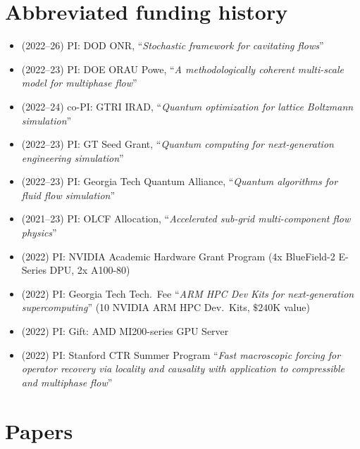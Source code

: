 \documentclass[11pt]{article}
\begin{document}
\section*{Abbreviated funding history}

\begin{itemize}
    \item (2022--26) PI: DOD ONR, ``\textit{Stochastic framework for cavitating flows}''
    \item (2022--23) PI: DOE ORAU Powe, ``\textit{A methodologically coherent multi-scale model for multiphase flow}''
    \item (2022--24) co-PI: GTRI IRAD, ``\textit{Quantum optimization for lattice Boltzmann simulation}''
    \item (2022--23) PI: GT Seed Grant, ``\textit{Quantum computing for next-generation engineering simulation}''
    \item (2022--23) PI: Georgia Tech Quantum Alliance, ``\textit{Quantum algorithms for fluid flow simulation}''
    \item (2021--23) PI: OLCF Allocation, ``\textit{Accelerated sub-grid multi-component flow physics}'' 
    \item (2022) PI: NVIDIA Academic Hardware Grant Program (4x BlueField-2 E-Series DPU, 2x A100-80)
    \item (2022) PI: Georgia Tech Tech.\ Fee ``\textit{ARM HPC Dev Kits for next-generation supercomputing}'' (10 NVIDIA ARM HPC Dev.\ Kits, $\$240$K value)
    \item (2022) PI: Gift: AMD MI200-series GPU Server
    \item (2022) PI: Stanford CTR Summer Program ``\textit{Fast macroscopic forcing for operator recovery via locality and causality with application to compressible and multiphase flow}''
\end{itemize}

\section*{Papers}


\nocite{*}

\begingroup
{}
\printbibliography[resetnumbers=false,type=unpublished,heading=none]
\vspace{-0.3cm}
\printbibliography[resetnumbers=false,filter=twopages,heading=none]
\endgroup
\end{document}
